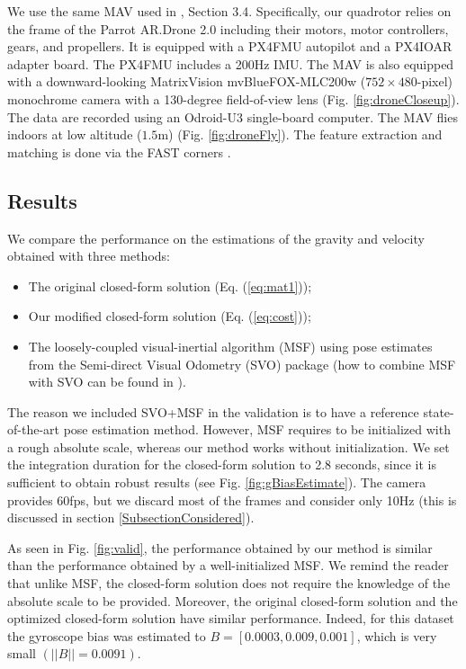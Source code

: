\documentclass[letterpaper, 10 pt, journal, twoside]{IEEEtran}  %
\begin{document}
We use the same MAV used in \cite{FaesslerICRA15}, Section 3.4.
Specifically, our quadrotor relies on the frame of the Parrot AR.Drone 2.0 including their motors, motor controllers, gears, and propellers.
It is equipped with a PX4FMU autopilot and a PX4IOAR adapter board.
The PX4FMU includes a 200Hz IMU.
The MAV is also equipped with a downward-looking MatrixVision mvBlueFOX-MLC200w ($752 \times 480$-pixel) monochrome camera with a 130-degree field-of-view lens (Fig. \ref{fig:droneCloseup}).
The data are recorded using an Odroid-U3 single-board computer.
The MAV flies indoors at low altitude ($1.5$m) (Fig. \ref{fig:droneFly}).
The feature extraction and matching is done via the FAST corners \cite{Rosten2005, Rosten2006}.

\subsection{Results}

We compare the performance on the estimations of the gravity and velocity obtained with three methods:
\begin{itemize}
\item The original closed-form solution \cite{Martinelli2014} (Eq. (\ref{eq:mat1}));
\item Our modified closed-form solution (Eq. (\ref{eq:cost}));
\item The loosely-coupled visual-inertial algorithm (MSF) \cite{LynenIROS13} using pose estimates from the Semi-direct Visual Odometry (SVO) package \cite{Forster2014} (how to combine MSF with SVO can be found in \cite{FaesslerICRA15}).
\end{itemize}
The reason we included SVO+MSF in the validation is to have a reference state-of-the-art pose estimation method.
However, MSF requires to be initialized with a rough absolute scale, whereas our method works without initialization.
We set the integration duration for the closed-form solution to 2.8 seconds, since it is sufficient to obtain robust results (see Fig. \ref{fig:gBiasEstimate}).
The camera provides 60fps, but we discard most of the frames and consider only 10Hz (this is discussed in section \ref{SubsectionConsidered}).

As seen in Fig. \ref{fig:valid}, the performance obtained by our method is similar than the performance obtained by a well-initialized MSF.
We remind the reader that unlike MSF, the closed-form solution does not require the knowledge of the absolute scale to be provided.
Moreover, the original closed-form solution and the optimized closed-form solution have similar performance.
Indeed, for this dataset the gyroscope bias was estimated to $B = [0.0003, 0.009, 0.001]$, which is very small $(||B|| = 0.0091)$.
\end{document}
